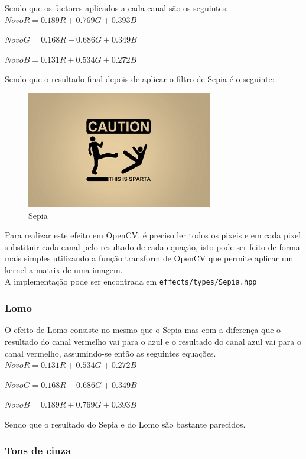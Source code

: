 \documentclass[portugues,final]{revdetua}
\begin{document}
Sendo que os factores\cite{sepia} aplicados a cada canal são os seguintes:\\

$Novo R = 0.189 R + 0.769 G + 0.393 B$

$Novo G = 0.168 R + 0.686 G + 0.349 B$

$Novo B = 0.131 R + 0.534 G + 0.272 B$

Sendo que o resultado final depois de aplicar o filtro de Sepia é o seguinte:

\begin{figure}[H]
\centerline{\includegraphics[width=230pt]{images/sepia.jpeg}}
\caption{Sepia}
\label{img:complete}
\end{figure}

Para realizar este efeito em OpenCV, é preciso ler todos os pixeis e em cada pixel substituir cada canal pelo resultado de cada equação, isto pode ser feito de forma mais simples utilizando a função transform de OpenCV que permite aplicar um kernel a matrix de uma imagem.\\

A implementação pode ser encontrada em {\tt effects/types/Sepia.hpp}

\subsubsection{Lomo}
O efeito de Lomo consiste no mesmo que o Sepia mas com a diferença que o resultado do canal vermelho vai para o azul e o resultado do canal azul vai para o canal vermelho, assumindo-se então as seguintes equações.\\

$Novo R = 0.131 R + 0.534 G + 0.272 B$

$Novo G = 0.168 R + 0.686 G + 0.349 B$

$Novo B = 0.189 R + 0.769 G + 0.393 B$

Sendo que o resultado do Sepia e do Lomo são bastante parecidos.

\subsubsection{Tons de cinza}
\end{document}

